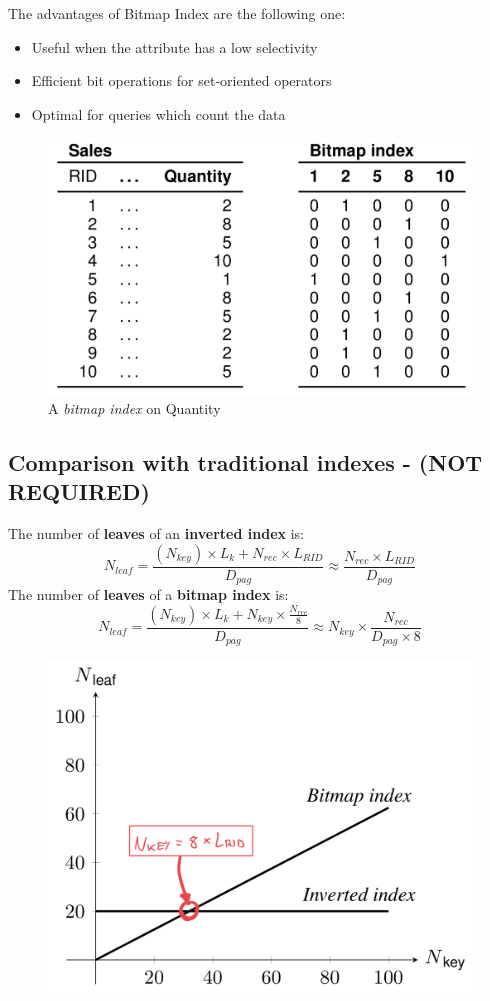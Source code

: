 The advantages of Bitmap Index are the following one:
\begin{itemize}
    \item Useful when the attribute has a low selectivity 
    \item Efficient bit operations for set-oriented operators 
    \item Optimal for queries which count the data
\end{itemize}

\begin{figure}[!h]
    \centering
    \includegraphics[width=0.5\linewidth]{images/DBMS_Internals/NonKeyAttributeOrganizations/bitmap_index.jpeg}
    \caption{A \textit{bitmap index} on Quantity}
\end{figure}

\subsection{Comparison with traditional indexes - (NOT REQUIRED)}
The number of \textbf{leaves} of an \textbf{inverted index} is:
\[N_{leaf} = \frac{(N_{key}) \times L_k + N_{rec} \times L_{RID}}{D_{pag}} \approx \frac{N_{rec} \times L_{RID}}{D_{pag}}\]
The number of \textbf{leaves} of a \textbf{bitmap index} is:
\[N_{leaf} = \frac{(N_{key}) \times L_k + N_{key} \times \frac{N_{rec}}{8}}{D_{pag}} \approx N_{key} \times \frac{N_{rec}}{D_{pag} \times 8}\]

\begin{figure}[!h]
    \centering
    \includegraphics[width=0.45\linewidth]{images/DBMS_Internals/NonKeyAttributeOrganizations/indexes_comparison.jpeg}
\end{figure}


